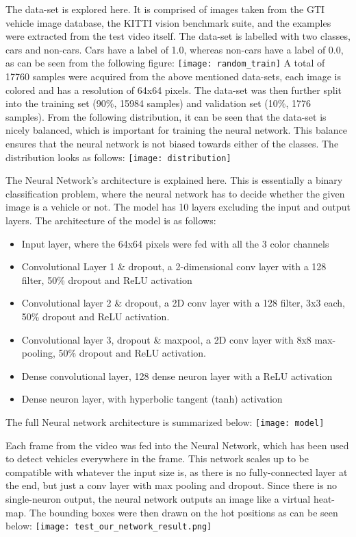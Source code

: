 \documentclass[conference]{IEEEtran}
\begin{document}
The data-set is explored here. It is comprised of images taken from the GTI vehicle image database\cite{b16}, the KITTI vision benchmark suite\cite{b17}, and the examples were extracted from the test video itself. The data-set is labelled with two classes, cars and non-cars. Cars have a label of 1.0, whereas non-cars have a label of 0.0, as can be seen from the following figure: 
\texttt{[image: random\_train]}
A total of 17760 samples were acquired from the above mentioned data-sets, each image is colored and has a resolution of 64x64 pixels. The data-set was then further split into the training set (90\%, 15984 samples) and validation set (10\%, 1776 samples). From the following distribution, it can be seen that the data-set is nicely balanced, which is important for training the neural network. This balance ensures that the neural network is not biased towards either of the classes. The distribution looks as follows:
\texttt{[image: distribution]}

The Neural Network's architecture is explained here. This is essentially a binary classification problem, where the neural network has to decide whether the given image is a vehicle or not. The model has 10 layers excluding the input and output layers. The architecture of the model is as follows:
\begin{itemize}
\item Input layer, where the 64x64 pixels were fed with all the 3 color channels
\item Convolutional Layer 1 \& dropout, a 2-dimensional conv layer with a 128 filter, 50\% dropout and ReLU activation
\item Convolutional layer 2 \& dropout, a 2D conv layer with a 128 filter, 3x3 each, 50\% dropout and ReLU activation. 
\item Convolutional layer 3, dropout \& maxpool, a 2D conv layer with 8x8 max-pooling, 50\% dropout and ReLU activation.
\item Dense convolutional layer, 128 dense neuron layer with a ReLU activation
\item Dense neuron layer, with hyperbolic tangent (tanh) activation
\end{itemize}
The full Neural network architecture is summarized below:
\texttt{[image: model]}

Each frame from the video was fed into the Neural Network, which has been used to detect vehicles everywhere in the frame. This network scales up to be compatible with whatever the input size is, as there is no fully-connected layer at the end, but just a conv layer with max pooling and dropout. Since there is no single-neuron output, the neural network outputs an image like a virtual heat-map. The bounding boxes were then drawn on the hot positions as can be seen below:
\texttt{[image: test\_our\_network\_result.png]}
\end{document}
